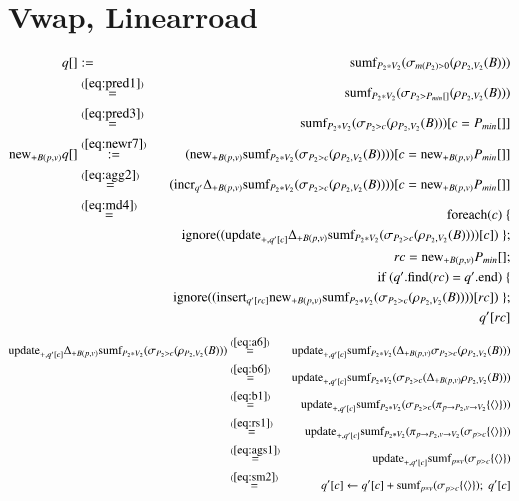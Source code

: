 \documentclass{article}
\newcommand{\tuple}[1]{{\langle#1\rangle}}
\begin{document}
\section{Vwap, Linearroad}
\begin{eqnarray*}
q[] &:=&
\mbox{sumf}_{P_2 * V_2}(\sigma_{m(P_2) > 0} (\rho_{P_2, V_2}(B)))
\\
&\stackrel{(\ref{eq:pred1})}{=}&
\mbox{sumf}_{P_2 * V_2}(\sigma_{P_2 > P_{min}[]} (\rho_{P_2, V_2}(B)))
\\
&\stackrel{(\ref{eq:pred3})}{=}&
\mbox{sumf}_{P_2 * V_2}(\sigma_{P_2 > c} (\rho_{P_2, V_2}(B)))[c=P_{min}[]]
\\
\mathrm{new}_{+B(p,v)} q[]
&\stackrel{(\ref{eq:newr7})}{:=}&
(\mathrm{new}_{+B(p,v)}
\mbox{sumf}_{P_2 * V_2}(\sigma_{P_2 > c} (\rho_{P_2, V_2}(B))))
[c=\mathrm{new}_{+B(p,v)} P_{min}[]]
\\
&\stackrel{(\ref{eq:agg2})}{=}&
(\mathrm{incr}_{q'} \Delta_{+B(p,v)} \mbox{sumf}_{P_2 * V_2}(\sigma_{P_2 > c} (\rho_{P_2 , V_2}(B))))
[c=\mathrm{new}_{+B(p,v)} P_{min}[]]
\\
&\stackrel{(\ref{eq:md4})}{=}&\mathrm{foreach}(\mbox{$c$}) \; \{ \\
&&\quad \mathrm{ignore}((\mathrm{update}_{+, q'[c]} \Delta_{+B(p,v)} \mbox{sumf}_{P_2 * V_2}(\sigma_{P_2 > c} (\rho_{P_2 , V_2}(B))))[c]) \; \};
\\
&& rc = \mathrm{new}_{+B(p,v)} P_{min}[];
\\
&& \mbox{if ($q'$.find($rc$) = $q'$.end)}
\; \{\\
&&\quad \mathrm{ignore}((\mathrm{insert}_{q'[rc]} \mathrm{new}_{+B(p,v)} \mbox{sumf}_{P_2 * V_2}(\sigma_{P_2 > c} (\rho_{P_2 , V_2}(B))))[rc]) \; \};
\\
&& q'[rc]
\\
\end{eqnarray*}
\begin{eqnarray*}
\algupdate_{+, q'[c]} \Delta_{+B(p,v)} \algsumf_{P_2 * V_2}(\sigma_{P_2 > c} (\rho_{P_2 , V_2}(B)))
&\stackrel{(\ref{eq:a6})}{=}&
\algupdate_{+, q'[c]} \algsumf_{P_2 * V_2}(\Delta_{+B(p,v)} \sigma_{P_2 > c} (\rho_{P_2, V_2} (B)))
\\
&\stackrel{(\ref{eq:b6})}{=}&
\algupdate_{+, q'[c]} \algsumf_{P_2 * V_2}(\sigma_{P_2 > c} (\Delta_{+B(p,v)} \rho_{P_2, V_2} (B)))
\\
&\stackrel{(\ref{eq:b1})}{=}&
\algupdate_{+, q'[c]} \algsumf_{P_2 * V_2}(\sigma_{P_2 > c} (\pi_{p\rightarrow P_2, v\rightarrow V_2}\{\tuple{}\}))
\\
&\stackrel{(\ref{eq:rs1})}{=}&
\algupdate_{+, q'[c]} \algsumf_{P_2 * V_2}(\pi_{p\rightarrow P_2, v\rightarrow V_2} (\sigma_{p > c} \{\tuple{}\}))
\\
&\stackrel{(\ref{eq:ags1})}{=}&
\algupdate_{+, q'[c]} \algsumf_{p * v} (\sigma_{p > c} \{\tuple{}\})
\\
&\stackrel{(\ref{eq:sm2})}{=}&
q'[c] \leftarrow q'[c] + \algsumf_{p * v} (\sigma_{p > c} \{\tuple{}\});\; q'[c]
\\
\end{eqnarray*}
\end{document}
